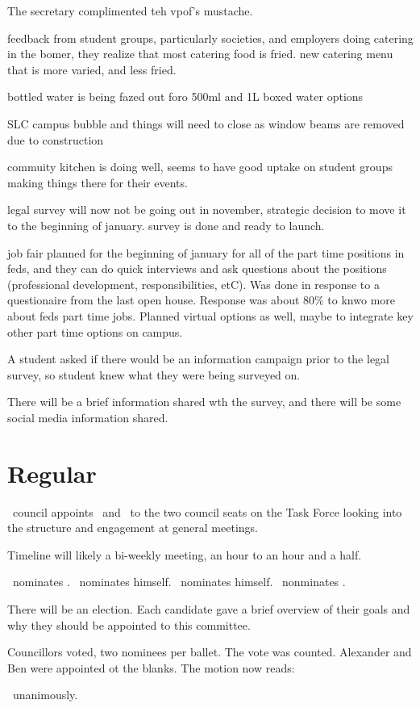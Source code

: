 \begin{information}

    The secretary complimented teh vpof's mustache. 

    feedback from student groups, particularly societies, and employers doing
    catering in the bomer, they realize that most catering food is fried. new
    catering menu that is more varied, and less fried. 

    bottled water is being fazed out foro 500ml and 1L boxed water options

    SLC campus bubble and things will need to close as window beams are removed
    due to construction

    commuity kitchen is doing well, seems to have good uptake on student groups
    making things there for their events. 

    legal survey will now not be going out in november, strategic decision to 
    move it to the beginning of january. survey is done and ready to launch.

    job fair planned for the beginning of january for all of the part time 
    positions in feds, and they can do quick interviews and ask questions
    about the positions (professional development, responsibilities, etC). 
    Was done in response to a questionaire from the last open house. Response
    was about 80\% to knwo more about feds part time jobs. Planned virtual 
    options as well, maybe to integrate key other part time options on campus.

    A student asked if there would be an information campaign prior to the 
    legal survey, so student knew what they were being surveyed on. 

    There will be a brief information shared wth the survey, and there will be
    some social media information shared. 

\end{information}

\section*{Regular}
\begin{motion}
    \birt\ council appoints \blank\ and \blank\ to the two council seats on the
    Task Force looking into the structure and engagement at general meetings. 
    \movers{\antonio}{\brian}

    Timeline will likely a bi-weekly meeting, an hour to an hour and a half.

    \alexander\ nominates \senecca. 
    \jason\ nominates himself.
    \alexander\ nominates himself.
    \andrewc\ nonminates \ben.

    There will be an election. Each candidate gave a brief overview of their
    goals and why they should be appointed to this committee.

    Councillors voted, two nominees per ballet.
    The vote was counted. Alexander and Ben were appointed ot the blanks. 
    The motion now reads:


    \carries\ unanimously.
\end{motion}

